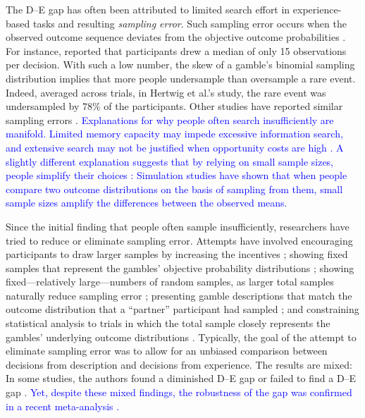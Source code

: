 \documentclass[a4paper, man, natbib, floatsintext]{apa6} %
\begin{document}
The D--E gap has often been attributed to limited search effort in experience-based tasks and resulting \textit{sampling error}. Such sampling error occurs when the observed outcome sequence deviates from the objective outcome probabilities \citep{Hadar2009}. For instance, \cite{Hertwig2004} reported that participants drew a median of only 15 observations per decision. With such a low number, the skew of a gamble's binomial sampling distribution implies that more people undersample than oversample a rare event. Indeed, averaged across trials, in Hertwig et al.'s study, the rare event was undersampled by $78\%$ of the participants. Other studies have reported similar sampling errors \citep[e.g.,][]{Hau2008,Rakow2008}. \textcolor{blue}{Explanations for why people often search insufficiently are manifold. Limited memory capacity may impede excessive information search, and extensive search may not be justified when opportunity costs are high \citep{Hau2008}. A slightly different explanation suggests that by relying on small sample sizes, people simplify their choices \citep{Hertwig2010}: Simulation studies have shown that when people compare two outcome distributions on the basis of sampling from them, small sample sizes amplify the differences between the observed means.}

Since the initial finding that people often sample insufficiently, researchers have tried to reduce or eliminate sampling error. Attempts have involved encouraging participants to draw larger samples by increasing the incentives \citep{Hau2008}; showing fixed samples that represent the gambles' objective probability distributions \citep{Ungemach2009}; showing fixed---relatively large---numbers of random samples, as larger total samples naturally reduce sampling error \citep{Hau2008,Hau2010}; presenting gamble descriptions that match the outcome distribution that a ``partner'' participant had sampled \citep{Rakow2008}; and constraining statistical analysis to trials in which the total sample closely represents the gambles' underlying outcome distributions \citep[e.g.,][]{Camilleri2009, Camilleri2011a}. Typically, the goal of the attempt to eliminate sampling error was to allow for an unbiased comparison between decisions from description and decisions from experience. The results are mixed: In some studies, the authors found a diminished D--E gap \citep{Hau2008,Hau2010, Ungemach2009} or failed to find a D--E gap \citep{Gloeckner2012, Camilleri2009,Camilleri2011a,Rakow2008}. \textcolor{blue}{Yet, despite these mixed findings, the robustness of the gap was confirmed in a recent meta-analysis \citep{Wulff2017}.}
\end{document}
